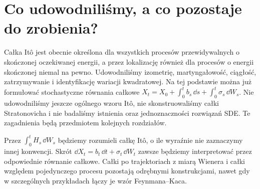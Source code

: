 \section{Co udowodniliśmy, a co pozostaje do zrobienia?}
Całka Itô jest obecnie określona dla wszystkich
procesów przewidywalnych o skończonej oczekiwanej energii,
a przez lokalizację również dla procesów o energii
skończonej niemal na pewno. Udowodniliśmy izometrię,
martyngałowość, ciągłość, zatrzymywanie i identyfikację
wariacji kwadratowej. Na tej podstawie można już
formułować stochastyczne równania całkowe
$X_t=X_0+\int_0^tb_s\,\dd s+\int_0^t\sigma_s\,\dd W_s$.
Nie udowodniliśmy jeszcze ogólnego wzoru Itô,
nie skonstruowaliśmy całki Stratonovicha i nie badaliśmy
istnienia oraz jednoznaczności rozwiązań SDE.
Te zagadnienia będą przedmiotem kolejnych rozdziałów.

\begin{uwaga}
Przez $\int_0^tH_s\,\dd W_s$ będziemy rozumieli
całkę Itô, o ile wyraźnie nie zaznaczymy innej
konwencji. Skrót $\dd X_t=b_t\,\dd t+\sigma_t\,\dd W_t$
zawsze będziemy interpretować przez odpowiednie
równanie całkowe. Całki po trajektoriach z miarą
Wienera i całki względem pojedynczego procesu
pozostają odrębnymi konstrukcjami, nawet gdy
w szczególnych przykładach łączy je wzór Feynmana--Kaca.
\end{uwaga}
